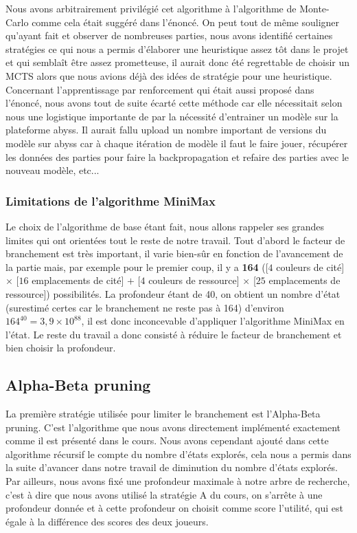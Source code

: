 \documentclass[a4paper,11pt,titlepage,leqno]{article}
\begin{document}
Nous avons arbitrairement privilégié cet algorithme à l'algorithme de Monte-Carlo comme cela était suggéré dans l'énoncé. On peut tout de même souligner qu'ayant fait et observer de nombreuses parties, nous avons identifié certaines stratégies ce qui nous a permis d'élaborer une heuristique assez tôt dans le projet et qui semblaît être assez prometteuse, il aurait donc été regrettable de choisir un MCTS alors que nous avions déjà des idées de stratégie pour une heuristique.\\

Concernant l'apprentissage par renforcement qui était aussi proposé dans l'énoncé, nous avons tout de suite écarté cette méthode car elle nécessitait selon nous une logistique importante de par la nécessité d'entrainer un modèle sur la plateforme abyss. Il aurait fallu upload un nombre important de versions du modèle sur abyss car à chaque itération de modèle il faut le faire jouer, récupérer les données des parties pour faire la backpropagation et refaire des parties avec le nouveau modèle, etc...\\

\subsubsection{Limitations de l'algorithme MiniMax}
Le choix de l'algorithme de base étant fait, nous allons rappeler ses grandes limites qui ont orientées tout le reste de notre travail. Tout d'abord le facteur de branchement est très important, il varie bien-sûr en fonction de l'avancement de la partie mais, par exemple pour le premier coup, il y a \textbf{164} ([$4$ couleurs de cité] $\times$ [$16$ emplacements de cité] $+$ [$4$ couleurs de ressource] $\times$ [$25$ emplacements de ressource]) possibilités. La profondeur étant de 40, on obtient un nombre d'état (surestimé certes car le branchement ne reste pas à 164) d'environ $164^{40} = 3,9\times 10^{88}$, il est donc inconcevable d'appliquer l'algorithme MiniMax en l'état. Le reste du travail a donc consisté à réduire le facteur de branchement et bien choisir la profondeur.

\subsection{Alpha-Beta pruning}
La première stratégie utilisée pour limiter le branchement est l'Alpha-Beta pruning. C'est l'algorithme que nous avons directement implémenté exactement comme il est présenté dans le cours. Nous avons cependant ajouté dans cette algorithme récursif le compte du nombre d'états explorés, cela nous a permis dans la suite d'avancer dans notre travail de diminution du nombre d'états explorés. Par ailleurs, nous avons fixé une profondeur maximale à notre arbre de recherche, c'est à dire que nous avons utilisé la stratégie A du cours, on s'arrête à une profondeur donnée et à cette profondeur on choisit comme score l'utilité, qui est égale à la différence des scores des deux joueurs.
\end{document}

